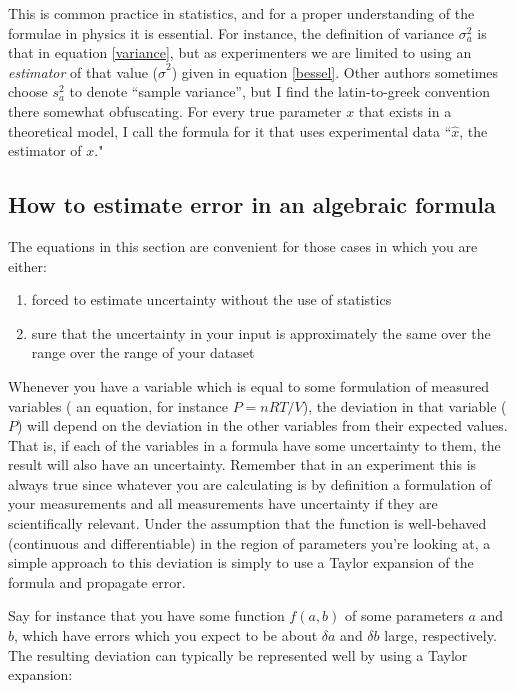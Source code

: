 This is common practice in statistics, and for a proper understanding of the formulae in physics it is essential. For instance, the definition of variance $\sigma_a^2$ is that in equation \ref{variance}, but as experimenters we are limited to using an \emph{estimator} of that value ($\hat \sigma^2$) given in equation \ref{bessel}. Other authors sometimes choose $s_a^2$ to denote ``sample variance'', but I find the latin-to-greek convention there somewhat obfuscating. For every true parameter $x$ that exists in a theoretical model, I call the formula for it that uses experimental data ``$\hat x$, the estimator of $x$."

\subsection{How to estimate error in an algebraic formula}

\begin{remark}
The equations in this section are convenient for those cases in which you are either:
\begin{enumerate}
\item forced to estimate uncertainty without the use of statistics
\item sure that the uncertainty in your input is approximately the same over the range over the range of your dataset
\end{enumerate} 
\end{remark}

Whenever you have a variable which is equal to some formulation of measured variables ( an equation, for instance $P = nRT/V$), the deviation in that variable ($P$) will depend on the deviation in the other variables from their expected values. That is, if each of the variables in a formula have some uncertainty to them, the result will also have an uncertainty. Remember that in an experiment this is always true since whatever you are calculating is by definition a formulation of your measurements and all measurements have uncertainty if they are scientifically relevant. Under the assumption that the function is well-behaved (continuous and differentiable) in the region of parameters you're looking at, a simple approach to this deviation is simply to use a Taylor expansion of the formula and propagate error.

Say for instance that you have some function $f(a,b)$ of some parameters $a$ and $b$, which have errors which you expect to be about $\delta a$ and $\delta b$ large, respectively. The resulting deviation can typically be represented well by using a Taylor expansion:

